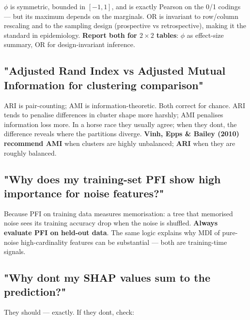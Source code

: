 \documentclass{article}
\begin{document}
\(\phi\) is symmetric, bounded in \([-1, 1]\), and is exactly Pearson on
the 0/1 codings --- but its maximum depends on the marginals. OR is
invariant to row/column rescaling and to the sampling design
(prospective vs retrospective), making it the standard in epidemiology.
\textbf{Report both for \(2 \times 2\) tables}: \(\phi\) as effect-size
summary, OR for design-invariant inference.

\subsection{"Adjusted Rand Index vs Adjusted Mutual Information for
clustering
comparison"}\label{adjusted-rand-index-vs-adjusted-mutual-information-for-clustering-comparison}

ARI is pair-counting; AMI is information-theoretic. Both correct for
chance. ARI tends to penalise differences in cluster shape more harshly;
AMI penalises information loss more. In a horse race they usually agree;
when they don\textquotesingle t, the difference reveals where the
partitions diverge. \textbf{Vinh, Epps \& Bailey (2010) recommend AMI}
when clusters are highly unbalanced; \textbf{ARI} when they are roughly
balanced.

\subsection{"Why does my training-set PFI show high importance for noise
features?"}\label{why-does-my-training-set-pfi-show-high-importance-for-noise-features}

Because PFI on training data measures memorisation: a tree that
memorised noise sees its training accuracy drop when the noise is
shuffled. \textbf{Always evaluate PFI on held-out data}. The same logic
explains why MDI of pure-noise high-cardinality features can be
substantial --- both are training-time signals.

\subsection{"Why don\textquotesingle t my SHAP values sum to the
prediction?"}\label{why-dont-my-shap-values-sum-to-the-prediction}

They should --- exactly. If they don\textquotesingle t, check:
\end{document}
